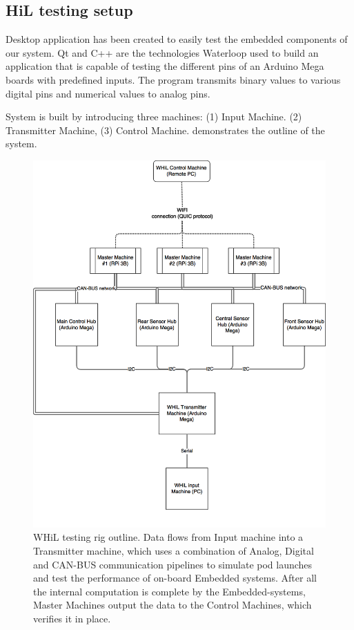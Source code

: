 \documentclass[main.tex]{subfiles}
\begin{document}
    \subsection{HiL testing setup}
    Desktop application has been created to easily test the embedded components of our system. Qt and C++ are the technologies Waterloop used to build an application that is capable of testing the different pins of an Arduino Mega boards with predefined inputs. The program transmits binary values to various digital pins and numerical values to analog pins.
   
    System is built by introducing three machines: (1) Input Machine. (2) Transmitter Machine, (3) Control Machine.  demonstrates the outline of the system.
   
      \begin{figure}
        \centering
 		\includegraphics[width=\textwidth]{images/hil_testing_rig.png}
		\caption{WHiL testing rig outline. Data flows from Input machine into a Transmitter machine, which uses a combination of Analog, Digital and CAN-BUS communication pipelines to simulate pod launches and test the performance of on-board Embedded systems. After all the internal computation is complete by the Embedded-systems, Master Machines output the data to the Control Machines, which verifies it in place.}
        \label{fig:hil-testing-rig}
   \end{figure}
   
\end{document}
